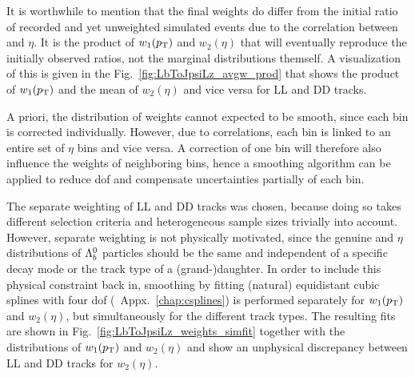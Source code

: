 It is worthwhile to mention that the final weights do differ from the initial ratio of recorded and yet unweighted simulated events due to the correlation between \pt and $\eta$.
It is the product of $w_1(\mbox{$p_{\mathrm{ T}}$})$ and $w_2(\eta)$ that will eventually reproduce the initially observed ratios, not the marginal distributions themself.
A visualization of this is given in the Fig.~\ref{fig:LbToJpsiLz_avgw_prod} that shows the product of $w_1(\mbox{$p_{\mathrm{ T}}$})$ and the mean of $w_2(\eta)$ and vice versa for \gls{LL} and \gls{DD} tracks.


A priori, the distribution of weights cannot expected to be smooth, since each bin is corrected individually.
However, due to correlations, each \pt bin is linked to an entire set of $\eta$ bins and vice versa.
A correction of one bin will therefore also influence the weights of neighboring bins, hence a smoothing algorithm can be applied to reduce \gls{dof} and compensate uncertainties partially of each bin.

The separate weighting of \gls{LL} and \gls{DD} tracks was chosen, because doing so takes different selection criteria and heterogeneous sample sizes trivially into account.
However, separate weighting is not physically motivated, since the genuine \pt and $\eta$ distributions of ${{\Lambda}^0_{b}}$ particles should be the same and independent of a specific decay mode or the track type of a \mbox{(grand-)daughter}.
In order to include this physical constraint back in, smoothing by fitting (natural) equidistant cubic splines with four \gls{dof} (\cf{}~Appx.~\ref{chap:csplines}) is performed separately for $w_1(\mbox{$p_{\mathrm{ T}}$})$ and $w_2(\eta)$, but simultaneously for the different track types.
The resulting fits are shown in Fig.~\ref{fig:LbToJpsiLz_weights_simfit} together with the distributions of $w_1(\mbox{$p_{\mathrm{ T}}$})$ and $w_2(\eta)$ and show an unphysical discrepancy between \gls{LL} and \gls{DD} tracks for $w_2(\eta)$.

